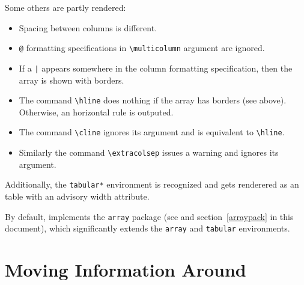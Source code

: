 Some others are partly rendered:
\begin{itemize}
\item Spacing between columns is different.
\item \verb+@+ formatting specifications in \verb+\multicolumn+
argument are ignored.
\item If a \verb+|+ appears somewhere in the column formatting
specification, then the array is shown with borders.
\item The command \verb+\hline+ does nothing if the array has borders
(see above). Otherwise, an horizontal rule is outputed.
\item The command \verb+\cline+ ignores its argument and is equivalent
to \verb+\hline+.
\item Similarly the command
\verb+\extracolsep+ issues a warning and ignores its argument.
\end{itemize}
Additionally, the \verb+tabular*+ environment is
recognized and gets renderered as an \html{} table with an advisory
width attribute.


By default, \hevea{} implements the \texttt{array} package
(see \cite[Section~5.3]{latexbis} and section~\ref{arraypack} in this
document), which significantly extends the
\verb+array+ and \verb+tabular+ environments.

\section{Moving Information Around}

